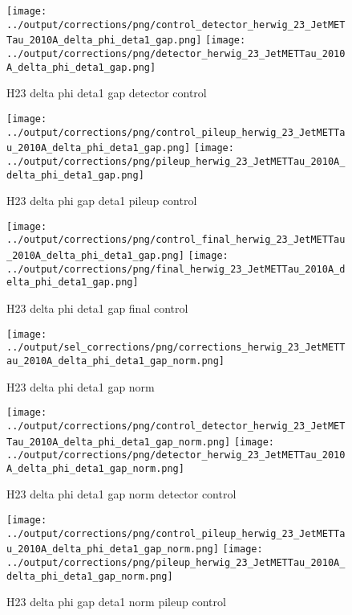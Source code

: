 \documentclass[11pt]{book}
\begin{document}
\begin{figure}[ht]
\centering
\texttt{[image: ../output/corrections/png/control\_detector\_herwig\_23\_JetMETTau\_2010A\_delta\_phi\_deta1\_gap.png]}
\texttt{[image: ../output/corrections/png/detector\_herwig\_23\_JetMETTau\_2010A\_delta\_phi\_deta1\_gap.png]}
\caption{H23 delta phi deta1 gap detector control}
\label{fig:H23_JetMETTau_2010A_delta_phi_deta1_gap_detector_control}
\end{figure}

\begin{figure}[ht]
\centering
\texttt{[image: ../output/corrections/png/control\_pileup\_herwig\_23\_JetMETTau\_2010A\_delta\_phi\_deta1\_gap.png]}
\texttt{[image: ../output/corrections/png/pileup\_herwig\_23\_JetMETTau\_2010A\_delta\_phi\_deta1\_gap.png]}
\caption{H23 delta phi gap deta1 pileup control}
\label{fig:H23_JetMETTau_2010A_delta_phi_deta1_gap_pileup_control}
\end{figure}


\begin{figure}[ht]
\centering
\texttt{[image: ../output/corrections/png/control\_final\_herwig\_23\_JetMETTau\_2010A\_delta\_phi\_deta1\_gap.png]}
\texttt{[image: ../output/corrections/png/final\_herwig\_23\_JetMETTau\_2010A\_delta\_phi\_deta1\_gap.png]}
\caption{H23 delta phi deta1 gap final control}
\label{fig:H23_JetMETTau_2010A_delta_phi_deta1_gap_final_control}
\end{figure}

\begin{figure}[ht]
\centering
\texttt{[image: ../output/sel\_corrections/png/corrections\_herwig\_23\_JetMETTau\_2010A\_delta\_phi\_deta1\_gap\_norm.png]}
\caption{H23 delta phi deta1 gap norm}
\label{fig:H23_JetMETTau_2010A_delta_phi_deta1_gap_norm}
\end{figure}

\begin{figure}[ht]
\centering
\texttt{[image: ../output/corrections/png/control\_detector\_herwig\_23\_JetMETTau\_2010A\_delta\_phi\_deta1\_gap\_norm.png]}
\texttt{[image: ../output/corrections/png/detector\_herwig\_23\_JetMETTau\_2010A\_delta\_phi\_deta1\_gap\_norm.png]}
\caption{H23 delta phi deta1 gap norm detector control}
\label{fig:H23_JetMETTau_2010A_delta_phi_deta1_gap_norm_detector_control}
\end{figure}

\begin{figure}[ht]
\centering
\texttt{[image: ../output/corrections/png/control\_pileup\_herwig\_23\_JetMETTau\_2010A\_delta\_phi\_deta1\_gap\_norm.png]}
\texttt{[image: ../output/corrections/png/pileup\_herwig\_23\_JetMETTau\_2010A\_delta\_phi\_deta1\_gap\_norm.png]}
\caption{H23 delta phi gap deta1 norm pileup control}
\label{fig:H23_JetMETTau_2010A_delta_phi_deta1_gap_norm_pileup_control}
\end{figure}
\end{document}
